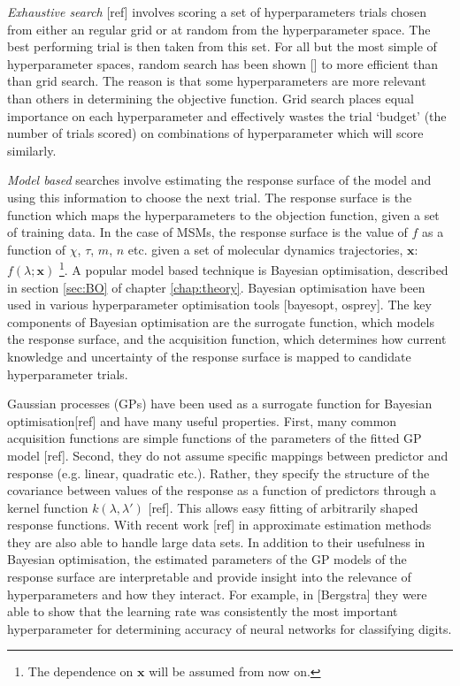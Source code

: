 \emph{Exhaustive search} [ref] involves scoring a set of  hyperparameters trials chosen from either an regular grid or at random from the hyperparameter space. The best performing trial is then taken from this set. For all but the most simple of hyperparameter spaces, random search has been shown [] to more efficient than  than grid search. The reason is that some hyperparameters are more relevant than others in determining the objective function. Grid search places equal importance on each hyperparameter and effectively wastes the trial `budget' (the number of trials scored) on combinations of hyperparameter which will score similarly. 

\emph{Model based} searches involve estimating the response surface of the model and using this information to choose the next trial. The response surface is the function which maps the hyperparameters to the objection function, given a set of training data. In the case of MSMs, the response surface is the value of $f$ as a function of $\chi$, $\tau$, $m$, $n$ etc. given a set of molecular dynamics trajectories, $\mathbf{x}$: $f(\lambda; \mathbf{x})$ \footnote{The dependence on $\mathbf{x}$ will be assumed from now on. }. A popular model based technique is Bayesian optimisation, described in section \ref{sec:BO} of chapter \ref{chap:theory}. Bayesian optimisation have been used in various hyperparameter optimisation tools [bayesopt, osprey].  The key components of Bayesian optimisation are the surrogate function, which models the response surface, and the acquisition function, which determines how current knowledge and uncertainty of the response surface is mapped to candidate hyperparameter trials. 

Gaussian processes (GPs) have been used as a surrogate function for Bayesian optimisation[ref] and have many useful properties. First, many common acquisition functions are simple functions of the parameters of the fitted GP model [ref]. Second, they do not assume specific mappings between predictor and response (e.g. linear, quadratic etc.). Rather, they specify the structure of the covariance between values of the response as a function of predictors through a kernel function $k(\lambda, \lambda')$ [ref]. This allows easy fitting of arbitrarily shaped response functions.  With recent work [ref] in approximate estimation methods they are also able to handle large data sets. In addition to their usefulness in Bayesian optimisation, the estimated parameters of the GP models of the response surface are interpretable and provide insight into the relevance of hyperparameters and how they interact.  For example, in [Bergstra] they were able to show that the learning rate was consistently the most important hyperparameter for determining accuracy of neural networks for classifying digits. 


